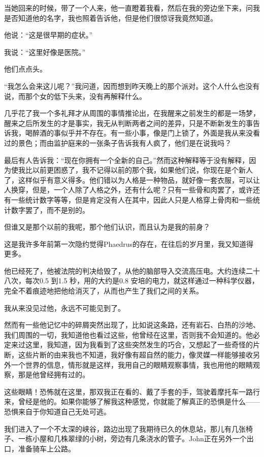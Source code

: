 \documentclass[UTF8]{article}
\begin{document}
\par 当她回来的时候，带了一个人来，他一直瞪着我看，然后在我的旁边坐下来，问我是否知道他的名字，我也照着告诉他，但是他们很惊讶我竟然知道。
\par 他说：“这是很早期的症状。”
\par 我说：“这里好像是医院。”
\par 他们点点头。
\par “我怎么会来这儿呢？”我问道，因而想到昨天晚上的那个派对。这个人什么也没有说，而那个女的低下头来，没有再解释什么。
\par 几乎花了我一个多礼拜才从周围的事情推论出，在我醒来之前发生的都是一场梦，醒来之后所发生的才是事实，我无从判断两者之间的差异，只是不断新发生的事告诉我，喝醉酒的事似乎并不存在。有一些小事，像是门上锁了，外面是我从来没看过的景色；而由监护庭来的一张条子告诉我有人疯了，他们是在说我吗？
\par 最后有人告诉我：“现在你拥有一个全新的自己。”然而这种解释等于没有解释，因为使我比以前更困惑了，我不记得以前的那个我，如果他们说，你现在是个新人了，这样似乎有意义得多。他们错以为人格是一种物品，就好像一套衣服，可以让人换穿，但是，一个人除了人格之外，还有什么呢？只有一些骨和肉罢了，或许还有一些统计数字等等，但是肯定没有人在其中，因此人只是人格穿上骨肉和一些统计数字罢了，而不是别的。
\par 但谁又是那个以前的我呢，那个他们认识，而且认为是我的前身？
\par 这是我许多年前第一次隐约觉得Phaedrus的存在，在往后的岁月里，我又知道得更多。
\par 他已经死了，他被法院的判决给毁了，从他的脑部导入交流高压电。大约连续二十八次，每次0.5 到1.5 秒，用的大约是0.8 安培的电力，就这样通过一种科学仪器，完全不着痕迹地把他给消灭了，从而也产生了我们之间的关系。
\par 我从来没见过他，永远不可能见到了。
\par 然而有一些他记忆中的碎屑突然出现了，比如说这条路，还有岩石、白热的沙地、我们周围的一切，我知道他也看过这些，他曾经在这里，否则我不会知道的。他必定来过这里，我知道，因为我看到了这些突然发生的巧合，又想起了一些奇怪的片断，这些片断的由来我也不知道，我好像有超自然的能力，像灵媒一样能够接收另外一个世界的信息，情形就是这样，我用自己的眼睛观察事情，我也用他的眼睛观察，那是他曾经拥有过的。
\par 这些眼睛！恐怖就在这里，那双我正在看的、戴了手套的手，驾驶着摩托车一路行来，曾经是他的。如果你能够了解我这种感觉，你就能了解真正的恐惧是什么——恐惧来自于你知道自己无处可逃。
\par 我们进入了一个不太深的峡谷，路边出现了我期待已久的休息站，那儿有几张椅子、一栋小屋和几株翠绿的小树，旁边有几条浇水的管子。John正在另外一个出口，准备骑车上公路。
\end{document}
